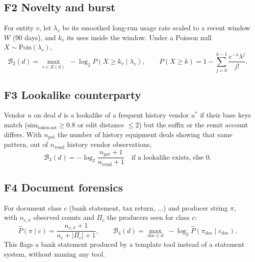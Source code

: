 \documentclass[11pt]{article}
\newcommand{\B}{\mathcal{B}}
\begin{document}
\subsection*{F2 \quad Novelty and burst}
For entity $v$, let $\lambda_v$ be its smoothed long-run usage rate scaled to a recent window $W$ (90 days), and $k_v$ its uses inside the window.
Under a Poisson null $X\sim\mathrm{Pois}(\lambda_v)$,
\begin{equation}
\B_2(d)=\max_{v\in E(d)}\; -\log_2 P(X\ge k_v\mid\lambda_v),
\qquad
P(X\ge k)=1-\sum_{j=0}^{k-1}\frac{e^{-\lambda}\lambda^j}{j!}.
\end{equation}

\subsection*{F3 \quad Lookalike counterparty}
Vendor $u$ on deal $d$ is a lookalike of a frequent history vendor $u^\ast$ if their base keys match ($\mathrm{sim}_{\text{token-set}}\ge 0.8$ or edit distance $\le 2$) but the suffix or the remit account differs.
With $n_{\text{pat}}$ the number of history equipment deals showing that same pattern, out of $n_{\text{vend}}$ history vendor observations,
\begin{equation}
\B_3(d)= -\log_2\frac{n_{\text{pat}}+1}{n_{\text{vend}}+1}\quad\text{if a lookalike exists, else }0 .
\end{equation}

\subsection*{F4 \quad Document forensics}
For document class $c$ (bank statement, tax return, ...) and producer string $\pi$, with $n_{c,\pi}$ observed counts and $\Pi_c$ the producers seen for class $c$:
\begin{equation}
\hat P(\pi\mid c)=\frac{n_{c,\pi}+1}{n_c+|\Pi_c|+1},\qquad
\B_4(d)=\max_{\text{doc}\in d}\; -\log_2 \hat P(\pi_{\text{doc}}\mid c_{\text{doc}}) .
\end{equation}
This flags a bank statement produced by a template tool instead of a statement system, without naming any tool.
\end{document}
